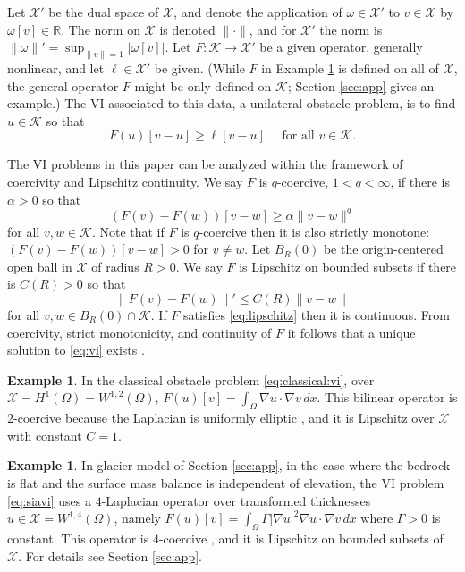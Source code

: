 \documentclass[]{interact}
\theoremstyle{plain}%
\theoremstyle{definition}
\newtheorem{example}[theorem]{Example}
\theoremstyle{remark}
\newcommand{\RR}{\mathbb{R}}
\newcommand{\grad}{\nabla}
\newcommand{\cK}{\mathcal{K}}
\newcommand{\cX}{\mathcal{X}}
\begin{document}
Let $\cX'$ be the dual space of $\cX$, and denote the application of $\omega \in \cX'$ to $v\in \cX$ by $\omega[v] \in \RR$.  The norm on $\cX$ is denoted $\|\cdot\|$, and for $\cX'$ the norm is $\|\omega\|' = \sup_{\|v\|=1} |\omega[v]|$.  Let $F:\cK \to \cX'$ be a given operator, generally nonlinear, and let $\ell\in \cX'$ be given.  (While $F$ in Example \ref{example:classicalobstacle} is defined on all of $\cX$, the general operator $F$ might be only defined on $\cK$; Section \ref{sec:app} gives an example.)  The VI associated to this data, a unilateral obstacle problem, is to find $u\in \cK$ so that
\begin{equation} \label{eq:vi}
F(u)[v - u] \ge \ell[v - u] \quad \text{ for all } v \in \cK.
\end{equation}

The VI problems in this paper can be analyzed within the framework of coercivity and Lipschitz continuity.  We say $F$ is $q$-coercive, $1<q<\infty$, if there is $\alpha>0$ so that
\begin{equation} \label{eq:coercive}
(F(v) - F(w))[v - w] \ge \alpha \|v-w\|^q
\end{equation}
for all $v,w \in \cK$.  Note that if $F$ is $q$-coercive then it is also strictly monotone: $(F(v) - F(w))[v - w] > 0$ for $v\ne w$.  Let $B_R(0)$ be the origin-centered open ball in $\cX$ of radius $R>0$.  We say $F$ is Lipschitz on bounded subsets if there is $C(R)>0$ so that
\begin{equation} \label{eq:lipschitz}
\|F(v)-F(w)\|' \le C(R) \|v-w\|
\end{equation}
for all $v,w \in B_R(0)\cap \cK$.  If $F$ satisfies \eqref{eq:lipschitz} then it is continuous.  From coercivity, strict monotonicity, and continuity of $F$ it follows that a unique solution to \eqref{eq:vi} exists \cite[Corollary III.1.8]{KinderlehrerStampacchia1980}.

\begin{example}  \label{example:classicalobstacle}
In the classical obstacle problem \eqref{eq:classical:vi}, over $\cX=H^1(\Omega)=W^{1,2}(\Omega)$, $F(u)[v] = \int_\Omega \grad u\cdot \grad v\,dx$.  This bilinear operator is $2$-coercive because the Laplacian is uniformly elliptic \cite{Evans2010}, and it is Lipschitz over $\cX$ with constant $C=1$.
\end{example}

\begin{example}  \label{example:flatsia}
In glacier model of Section \ref{sec:app}, in the case where the bedrock is flat and the surface mass balance is independent of elevation, the VI problem \eqref{eq:siavi} uses a $4$-Laplacian operator over transformed thicknesses $u\in\cX=W^{1,4}(\Omega)$, namely $F(u)[v] = \int_\Omega \Gamma |\grad u|^2\grad u\cdot \grad v\,dx$ where $\Gamma>0$ is constant.  This operator is $4$-coercive \cite[for example]{JouvetBueler2012}, and it is Lipschitz on bounded subsets of $\cX$.  For details see Section \ref{sec:app}.
\end{example}
\end{document}
